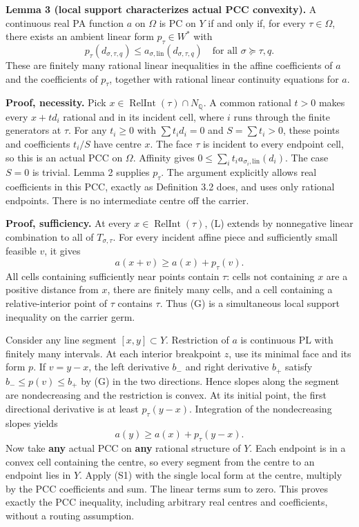 \documentclass[
  11pt,
]{article}
\begin{document}
\textbf{Lemma 3 (local support characterizes actual PCC convexity).} A
continuous real PA function \(a\) on \(\Omega\) is PC on \(Y\) if and
only if, for every \(\tau\in\Omega\), there exists an ambient linear
form \(p_\tau\in W^*\) with \[
p_\tau(d_{\sigma,\tau,q})
\leq a_{\sigma,\mathrm{lin}}(d_{\sigma,\tau,q})
\quad\text{for all }\sigma\succeq\tau,q.
\tag{L}
\] These are finitely many rational linear inequalities in the affine
coefficients of \(a\) and the coefficients of \(p_\tau\), together with
rational linear continuity equations for \(a\).

\textbf{Proof, necessity.} Pick
\(x\in\operatorname{RelInt}(\tau)\cap N_{\mathbb Q}\). A common rational
\(t>0\) makes every \(x+td_i\) rational and in its incident cell, where
\(i\) runs through the finite generators at \(\tau\). For any
\(t_i\geq0\) with \(\sum t_id_i=0\) and \(S=\sum t_i>0\), these points
and coefficients \(t_i/S\) have centre \(x\). The face \(\tau\) is
incident to every endpoint cell, so this is an actual PCC on \(\Omega\).
Affinity gives \(0\leq\sum_i t_i a_{\sigma_i,\mathrm{lin}}(d_i)\). The
case \(S=0\) is trivial. Lemma 2 supplies \(p_\tau\). The argument
explicitly allows real coefficients in this PCC, exactly as Definition
3.2 does, and uses only rational endpoints. There is no intermediate
centre off the carrier.

\textbf{Proof, sufficiency.} At every
\(x\in\operatorname{RelInt}(\tau)\), (L) extends by nonnegative linear
combination to all of \(T_{\sigma,\tau}\). For every incident affine
piece and sufficiently small feasible \(v\), it gives \[
a(x+v)\geq a(x)+p_\tau(v).
\tag{G}
\] All cells containing sufficiently near points contain \(\tau\): cells
not containing \(x\) are a positive distance from \(x\), there are
finitely many cells, and a cell containing a relative-interior point of
\(\tau\) contains \(\tau\). Thus (G) is a simultaneous local support
inequality on the carrier germ.

Consider any line segment \([x,y]\subset Y\). Restriction of \(a\) is
continuous PL with finitely many intervals. At each interior breakpoint
\(z\), use its minimal face and its form \(p\). If \(v=y-x\), the left
derivative \(b_-\) and right derivative \(b_+\) satisfy
\(b_-\leq p(v)\leq b_+\) by (G) in the two directions. Hence slopes
along the segment are nondecreasing and the restriction is convex. At
its initial point, the first directional derivative is at least
\(p_\tau(y-x)\). Integration of the nondecreasing slopes yields \[
a(y)\geq a(x)+p_\tau(y-x).
\tag{S1}
\] Now take \textbf{any} actual PCC on \textbf{any} rational structure
of \(Y\). Each endpoint is in a convex cell containing the centre, so
every segment from the centre to an endpoint lies in \(Y\). Apply (S1)
with the single local form at the centre, multiply by the PCC
coefficients and sum. The linear terms sum to zero. This proves exactly
the PCC inequality, including arbitrary real centres and coefficients,
without a routing assumption.
\end{document}
